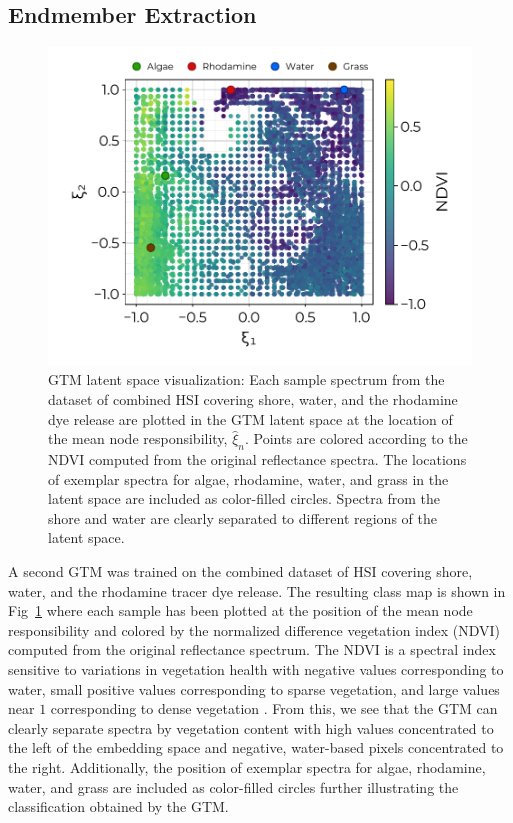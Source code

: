 \documentclass[remotesensing,article,submit,pdftex,moreauthors]{Definitions/mdpi}
\begin{document}
\subsection{Endmember Extraction}

\begin{figure}[t]
\centering
\includegraphics[width=0.8\columnwidth]{paper/figures/results/square-ndvi.pdf}
\caption{GTM latent space visualization: Each sample spectrum from the dataset of combined HSI covering shore, water, and the rhodamine dye release are plotted in the GTM latent space at the location of the mean node responsibility, $\hat{\xi}_n$. Points are colored according to the NDVI computed from the original reflectance spectra. The locations of exemplar spectra for algae, rhodamine, water, and grass in the latent space are included as color-filled circles. Spectra from the shore and water are clearly separated to different regions of the latent space.\label{fig:gtm-ndvi}}
\end{figure}  

A second GTM was trained on the combined dataset of HSI covering shore, water, and the rhodamine tracer dye release. The resulting class map is shown in Fig~\ref{fig:gtm-ndvi} where each sample has been plotted at the position of the mean node responsibility and colored by the normalized difference vegetation index (NDVI) computed from the original reflectance spectrum. The NDVI is a spectral index sensitive to variations in vegetation health with negative values corresponding to water, small positive values corresponding to sparse vegetation, and large values near $1$ corresponding to dense vegetation \cite{thenkabail2018hyperspectral}. From this, we see that the GTM can clearly separate spectra by vegetation content with high values concentrated to the left of the embedding space and negative, water-based pixels concentrated to the right. Additionally, the position of exemplar spectra for algae, rhodamine, water, and grass are included as color-filled circles further illustrating the classification obtained by the GTM.
\end{document}
